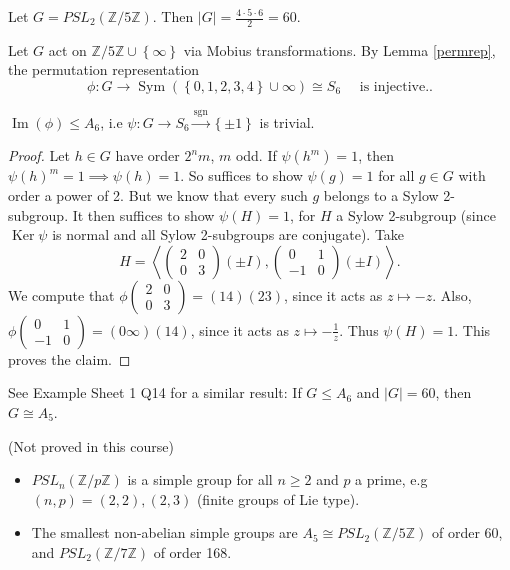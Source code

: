 \documentclass[egregdoesnotlikesansseriftitles,a4paper]{scrartcl}
\begin{document}
\begin{example*}
      Let $G=PSL_2 (\mathbb{Z}/5\mathbb{Z})$. Then $|G|= \frac{4 \cdot 5 \cdot  6}{2}=60$. 
      
      Let $G$ act on $\mathbb{Z}/5\mathbb{Z} \cup \left\{ \infty\right\}$ via Mobius transformations. By Lemma \ref{permrep}, the permutation representation \[
      \phi: G \rightarrow \operatorname{Sym}(\left\{0,1,2,3,4\right\}\cup \infty) \cong S_{6} \quad  \text{ is injective.}
      .\]
      \begin{claim}
            $\operatorname{Im} (\phi) \leq A_6 $, i.e $\psi: G \rightarrow S_6 \xrightarrow{\operatorname{sgn}} \left\{\pm 1\right\}$ is trivial. 
      \end{claim}
      \begin{proof}
            Let $h \in G$ have order $2^{n}m$, $m$ odd. If $\psi (h^{m})=1$, then $\psi (h)^{m}=1 \implies \psi (h)=1$. So suffices to show $\psi (g)=1$ for all $g \in G$ with order a power of 2. But we know that every such $g$ belongs to a Sylow 2-subgroup. It then suffices to show $\psi (H)=1$, for $H$ a Sylow 2-subgroup (since $\operatorname{Ker} \psi$ is normal and all Sylow 2-subgroups are conjugate). Take \[
                  H=\left\langle \begin{pmatrix} 2&0\\0&3 \end{pmatrix}(\pm I),\begin{pmatrix} 0&1\\-1&0 \end{pmatrix} (\pm I)\right\rangle
              .\] We compute that $\phi \begin{pmatrix} 2&0\\0&3 \end{pmatrix}= (14)(23)$, since it acts as $z \mapsto -z$. Also, $\phi \begin{pmatrix} 0&1\\-1&0 \end{pmatrix}= (0 \infty)(14)$, since it acts as $z \mapsto -\frac{1}{z}$. Thus $\psi (H)=1$. This proves the claim. 
      \end{proof}
      See Example Sheet 1 Q14 for a similar result: If $G \leq A_6 $ and $|
      G|=60$, then $G \cong A_5 $.
\end{example*}
\begin{remarks}
      (Not proved in this course)\hfill 
      \begin{itemize}
           \item $PSL_n (\mathbb{Z}/p\mathbb{Z})$ is a simple group for all $n \geq 2$ and $p$ a prime, e.g $(n,p)=(2,2), (2,3)$ (finite groups of Lie type). 
           \item The smallest non-abelian simple groups are $A_5 \cong PSL_2 (\mathbb{Z}/5\mathbb{Z})$ of order 60, and $PSL_2 (\mathbb{Z}/7\mathbb{Z})$ of order 168.
      \end{itemize}
\end{remarks}
\newpage
\end{document}
